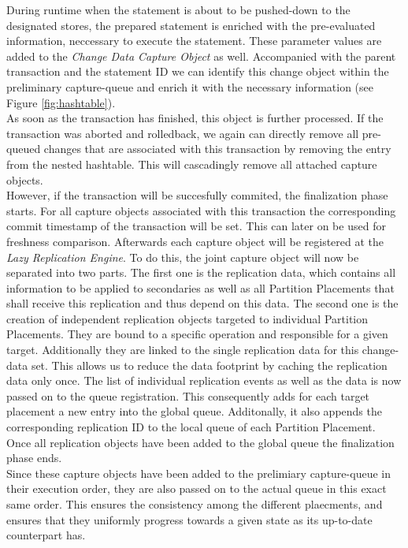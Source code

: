 During runtime when the statement is about to be pushed-down to the designated stores, the prepared statement is enriched with the pre-evaluated information, 
neccessary to execute the statement. These parameter values are added to the \emph{Change Data Capture Object} as well. 
Accompanied with the parent transaction and the statement ID we can identify this change object within the preliminary capture-queue 
and enrich it with the necessary information (see Figure \ref{fig:hashtable}).\\
As soon as the transaction has finished, this object is further processed. If the transaction was aborted and rolledback, we again can directly remove all pre-queued changes 
that are associated with this transaction by removing the entry from the nested hashtable. This will cascadingly remove all attached capture objects.\\
However, if the transaction will be succesfully commited, the finalization phase starts. For all capture objects associated with this transaction the corresponding commit 
timestamp of the transaction will be set. This can later on be used for freshness comparison. Afterwards each capture object will be registered at the \emph{Lazy Replication Engine}. 
To do this, the joint capture object will now be separated into two parts. The first one is the replication data, which contains all information to be applied to 
secondaries as well as all Partition Placements that shall receive this replication and thus depend on this data. The second one is the creation of independent replication 
objects targeted to individual Partition Placements. They are bound to a specific operation and responsible for a given target. Additionally they are linked to the single replication data for this change-data set.
This allows us to reduce the data footprint by caching the replication data only once. The list of individual replication events as well as the data is now passed on to the
queue registration. This consequently adds for each target placement a new entry into the global queue. Additonally, it also appends the corresponding replication ID to 
the local queue of each Partition Placement. Once all replication objects have been added to the global queue the finalization phase ends.\\
Since these capture objects have been added to the prelimiary capture-queue in their execution order, they are also passed on to the actual queue in this exact same order.
This ensures the consistency among the different plaecments, and ensures that they uniformly progress towards a given state as its up-to-date counterpart has.

